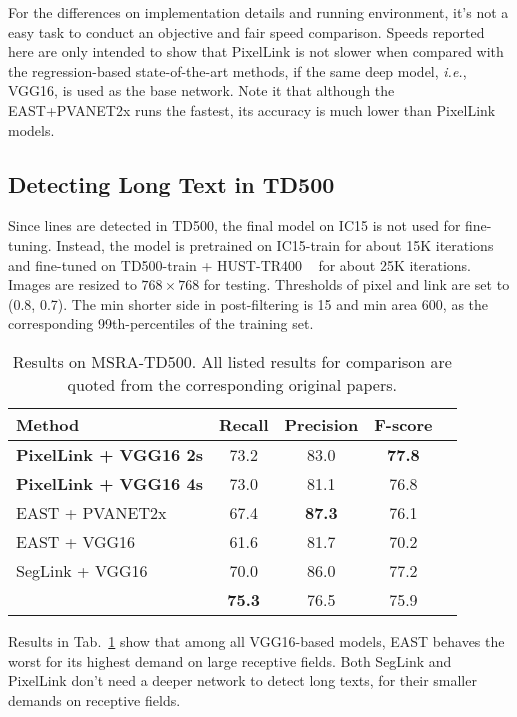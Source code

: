 \documentclass[letterpaper]{article} \usepackage{aaai18}  \usepackage{times}  \usepackage{helvet}  \usepackage{courier}  \usepackage{url}  \usepackage{graphicx}
\begin{document}
	For the differences on implementation details and running environment, it's not a easy task to conduct an objective and fair speed comparison. Speeds reported here are only intended to show that PixelLink is not slower when compared with the regression-based state-of-the-art methods, if the same deep model, \emph{i.e.}, VGG16, is used as the base network. Note it that although the EAST+PVANET2x runs the fastest, its accuracy is much lower than PixelLink models.
	
	
	\subsection{Detecting Long Text in TD500}
	Since lines are detected in TD500, the final model on IC15 is not used for fine-tuning. Instead, the model is pretrained on IC15-train for about 15K iterations and fine-tuned on TD500-train + HUST-TR400 ~\cite{Yao2014TR400} for about 25K iterations. Images are resized to $768 \times 768$ for testing. Thresholds of pixel and link are set to (0.8, 0.7). The min shorter side in post-filtering is 15 and min area 600, as the corresponding 99th-percentiles of the training set.
	
	\begin{table}
		\centering
		\caption{Results on MSRA-TD500.  All listed results for comparison are quoted from the corresponding original papers.}
		\label{table:results-on-msra-td500}
		\begin{tabular}{|l|c|c|c|c|}
			\hline
			Method              &Recall     &Precision      &F-score\\
			\hline
			\hline
			\textbf{PixelLink + VGG16 2s}    &73.2   &83.0   &\textbf{77.8} \\
			\hline
			\textbf{PixelLink + VGG16 4s}    &73.0   &81.1   &76.8 \\
			\hline
			EAST + PVANET2x       &67.4   &\textbf{87.3}  &76.1 \\
			\hline
			EAST + VGG16        &61.6   &81.7   &70.2 \\
			\hline
			SegLink + VGG16     &70.0   &86.0   &77.2 \\
			\hline
			\cite{yao2016scene} &\textbf{75.3}  &76.5   &75.9 \\
			\hline
		\end{tabular}
	\end{table}
	
	Results in Tab.~\ref{table:results-on-msra-td500} show that among all VGG16-based models, EAST behaves the worst for its highest demand on large receptive fields. Both SegLink and PixelLink don't need a deeper network to detect long texts, for their smaller demands on receptive fields.
\end{document}
